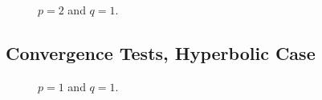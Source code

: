 \vspace*{\fill}
\begin{figure}[!ht]
    \begin{subfigure}[t]{0.49\textwidth}
        \centering
        
        \label{graph:2_1_par_l2l2}
    \end{subfigure}
    \hfill
    \begin{subfigure}[t]{0.49\textwidth}
        \centering
        
        \label{graph:2_1_par_l2h1}
    \end{subfigure}
    \par\bigskip
    \begin{subfigure}[t]{0.49\textwidth}
        \centering
        
        \label{graph:2_1_par_l2T}
    \end{subfigure}
    \hfill
    \begin{subfigure}[t]{0.49\textwidth}
        \centering
        
        \label{graph:2_1_par_linfl2}
    \end{subfigure}
    \caption{$p = 2$ and $q = 1$.}
\end{figure}
\vspace*{\fill}

\newpage
\subsection{Convergence Tests, Hyperbolic Case} \label{sec:graphs_2}


\vspace*{\fill}
\begin{figure}[!ht]
    \centering
    \begin{subfigure}[t]{0.49\textwidth}
        \centering
        
        \label{graph:1_1_hyp_l2l2}
    \end{subfigure}
    \par\bigskip
    \begin{subfigure}[t]{0.49\textwidth}
        \centering
        
        \label{graph:1_1_hyp_l2T}
    \end{subfigure}
    \hfill
    \begin{subfigure}[t]{0.49\textwidth}
        \centering
        
        \label{graph:1_1_hyp_linfl2}
    \end{subfigure}
    \caption{$p = 1$ and $q = 1$.}
\end{figure}
\vspace*{\fill}

